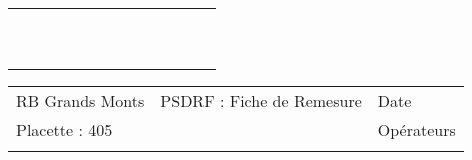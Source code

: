 \documentclass[a4paper, landscape]{article}\usepackage[]{graphicx}\usepackage[]{color}
\begin{document}
{\begin{tabular}{|p{1cm}|p{2cm}|p{1.6cm}|p{1.6cm}|p{1.6cm}|p{1.6cm}|p{1.5cm}|p{1.5cm}|p{1.5cm}|p{1.5cm}|p{1.5cm}|p{7.5cm}|p{5cm}|}
   \hline
 &  &  &  &  &  &  &  &  &  &  &  &  \\ 
   \rowcolor[gray]{0.95} \hline
 &  &  &  &  &  &  &  &  &  &  &  &  \\ 
   \hline
 &  &  &  &  &  &  &  &  &  &  &  &  \\ 
   \rowcolor[gray]{0.95} \hline
 &  &  &  &  &  &  &  &  &  &  &  &  \\ 
   \hline
 &  &  &  &  &  &  &  &  &  &  &  &  \\ 
   \rowcolor[gray]{0.95} \hline
 &  &  &  &  &  &  &  &  &  &  &  &  \\ 
   \hline
 &  &  &  &  &  &  &  &  &  &  &  &  \\ 
   \rowcolor[gray]{0.95} \hline
 &  &  &  &  &  &  &  &  &  &  &  &  \\ 
   \hline
 &  &  &  &  &  &  &  &  &  &  &  &  \\ 
   \rowcolor[gray]{0.95} \hline
 &  &  &  &  &  &  &  &  &  &  &  &  \\ 
   \hline
\end{tabular}
}

\begin{tabular}{p{10cm}p{10cm}p{8cm}}
  RB Grands Monts & PSDRF : Fiche de Remesure & Date \\ 
  Placette : 405 &  & Opérateurs \\ 
   &  &  \\ 
  \end{tabular}
\end{document}

